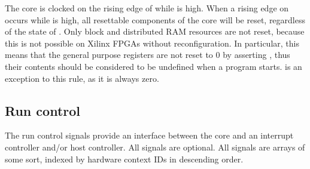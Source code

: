 \documentclass[main.tex]{subfiles}
\begin{document}
The core is clocked on the rising edge of  while  is high. When a rising edge on  occurs while  is high, all resettable components of the core will be reset, regardless of the state of . Only block and distributed RAM resources are not reset, because this is not possible on Xilinx FPGAs without reconfiguration. In particular, this means that the general purpose registers are not reset to 0 by asserting , thus their contents should be considered to be undefined when a program starts.  is an exception to this rule, as it is always zero.

\subsection{Run control}

The run control signals provide an interface between the core and an interrupt controller and/or host controller. All signals are optional. All signals are arrays of some sort, indexed by hardware context IDs in descending order.
\end{document}
